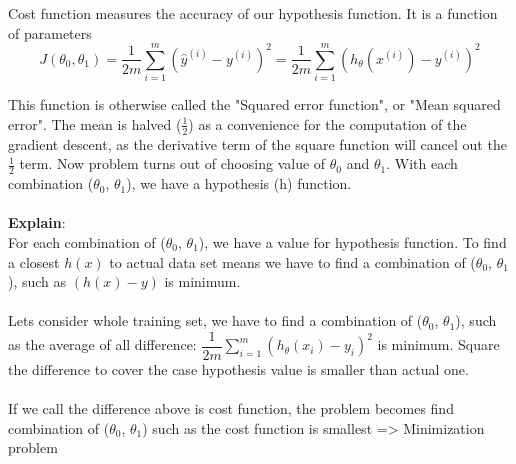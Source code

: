 Cost function measures the accuracy of our hypothesis function. It is a function of parameters
\begin{equation*}
	J(\theta_0, \theta_1) = \dfrac {1}{2m} \displaystyle \sum _{i=1}^m \left ( \hat{y}^{(i)}- y^{(i)} \right)^2 = \dfrac {1}{2m} \displaystyle \sum _{i=1}^m \left (h_\theta (x^{(i)}) - y^{(i)} \right)^2
\end{equation*}

This function is otherwise called the "Squared error function", or "Mean squared error". The mean is halved ($\frac{1}{2}$) as a convenience for the computation of the gradient descent, as the derivative term of the square function will cancel out the $\frac{1}{2}$ term.
Now problem turns out of choosing value of $\theta_{0}$ and $\theta_1$. With each combination ($\theta_{0}$, $\theta_1$), we have a hypothesis (h) function.\\ \\
\textbf{Explain}:\\
	For each combination of ($\theta_{0}$, $\theta_1$), we have a value for hypothesis function. To find a closest $h(x)$ to actual data set means we have to find a combination of ($\theta_{0}$, $\theta_1$), such as $(h(x) - y)$ is minimum. \\ \\
	Lets consider whole training set, we have to find a combination of ($\theta_{0}$, $\theta_1$), such as the average of all difference: $\dfrac {1}{2m}\displaystyle \sum _{i=1}^m \left (h_\theta (x_{i}) - y_{i} \right)^2$ is minimum. Square the difference to cover the case hypothesis value is smaller than actual one. \\ \\
	
	If we call the difference above is cost function, the problem becomes find combination of ($\theta_{0}$, $\theta_1$) such as the cost function is smallest => Minimization problem
	
